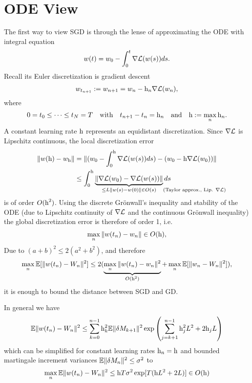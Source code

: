 \section{ODE View}

The first way to view SGD is through the lense of approximating the ODE with
integral equation
\begin{align*}
	w(t) =  w_0 -\int_{0}^{t}\nabla\mathcal{L}(w(s))ds.
\end{align*}
Recall its Euler discretization is gradient descent 
\begin{align*}
	w_{t_{n+1}}:=w_{n+1}
	= w_n - \text{h}_n \nabla\mathcal{L}(w_n),
\end{align*}
where
\begin{align*}
	0=t_0 \le \dots \le t_N= T \quad \text{with} \quad t_{n+1}-t_n=\text{h}_n
	\quad \text{and}\quad \text{h}:=\max_n \text{h}_n.
\end{align*}
A constant learning rate \(\text{h}\) represents an equidistant discretization.
Since \(\nabla\mathcal{L}\) is Lipschitz continuous, the local discretization error
\begin{align*}
	\|\weights(\lr)  - \weights_\lr \|
	&= \|(\weights_0 - \int_0^\lr\nabla\Loss(\weights(s))ds) - (\weights_0-\lr\nabla\Loss(\weights_0))\|\\
	&\le  \int_0^\lr \underbrace{\|\nabla\Loss(\weights_0) - \nabla\Loss(\weights(s))\|}_{
		\le \ubound \|\weights(s) - \weights(0)\| \in O(s) \mathrlap{\quad\text{(Taylor approx., Lip. \(\nabla\Loss\))}}
	}ds 
\end{align*}
is of order \(O(\text{h}^2)\). 
Using the discrete Gr\"onwall's inequality and stability of the ODE (due to Lipschitz continuity of
\(\nabla\mathcal{L}\) and the continuous Gr\"onwall inequality) the global discretization
error is therefore of order 1, i.e.
\begin{align*}
	\max_{n} \|w(t_n) - w_n\| \in O(\text{h}),
\end{align*}
Due to \((a+b)^2\le2(a^2+b^2)\), and therefore 
\begin{align*}
	\max_n\mathbb{E}[\|w(t_n)-W_n\|^2]
	\le 2(\underbrace{\max_n \|w(t_n)-w_n\|^2}_{O(\text{h}^2)}
	+\max_{n}\mathbb{E}[\|w_n - W_n\|^2]),
\end{align*}
it is enough to bound the distance between SGD and GD.
\begin{theorem}\label{thm: distance SGD vs GD}
	In general we have
	\begin{align*}
		\mathbb{E}\|w(t_n)-W_n\|^2
		\le \sum_{k=0}^{n-1}\text{h}_k^2\mathbb{E}\|\delta M_{k+1}\|^2\exp\left(
			\sum_{j=k+1}^{n-1}\text{h}_j^2L^2 + 2\text{h}_jL
		\right)
	\end{align*}
	which can be simplified for constant learning rates \(\text{h}_n=\text{h}\) and bounded
	martingale increment variances \(\mathbb{E}\|\delta M_n\|^2 \le \sigma^2\) to
	\begin{align*}
		\max_{n}\mathbb{E}\|w(t_n)	-W_n\|^2
		\le \text{h} T\sigma^2\exp[T(\text{h}L^2 + 2L)] \in O(\text{h})
	\end{align*}
\end{theorem}
